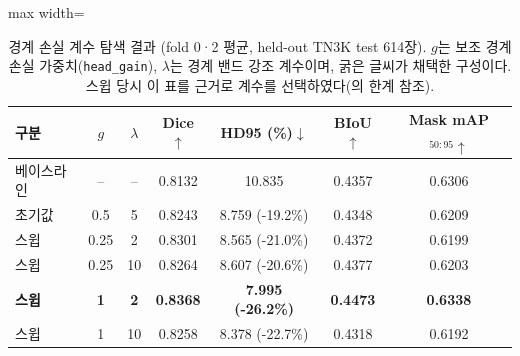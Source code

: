 \begin{table}[htbp]
\centering
\small
\caption[경계 손실 계수 탐색 결과 (fold 0·2 평균, held-out TN3K test 614장).]{경계 손실 계수 탐색 결과 (fold 0·2 평균, held-out TN3K test 614장). $g$는 보조 경계 손실 가중치(\texttt{head\_gain}), $\lambda$는 경계 밴드 강조 계수이며, 굵은 글씨가 채택한 구성이다. 스윕 당시 이 표를 근거로 계수를 선택하였다(의 한계 참조).}
\label{tab:sweep_test}
\begin{adjustbox}{max width=\linewidth}
\begin{tabular}{lcccccc}
\toprule
구분 & $g$ & $\lambda$ & Dice$\uparrow$ & HD95 (\%)$\downarrow$ & BIoU$\uparrow$ & Mask mAP$_{50:95}\uparrow$ \\
\midrule
베이스라인 & -- & -- & 0.8132 & 10.835 & 0.4357 & 0.6306 \\
\midrule
초기값 & 0.5 & 5 & 0.8243 & 8.759 (-19.2\%) & 0.4348 & 0.6209 \\
\midrule
스윕 & 0.25 & 2 & 0.8301 & 8.565 (-21.0\%) & 0.4372 & 0.6199 \\
스윕 & 0.25 & 10 & 0.8264 & 8.607 (-20.6\%) & 0.4377 & 0.6203 \\
\textbf{스윕} & \textbf{1} & \textbf{2} & \textbf{0.8368} & \textbf{7.995 (-26.2\%)} & \textbf{0.4473} & \textbf{0.6338} \\
스윕 & 1 & 10 & 0.8258 & 8.378 (-22.7\%) & 0.4318 & 0.6192 \\
\bottomrule
\end{tabular}
\end{adjustbox}
\end{table}
